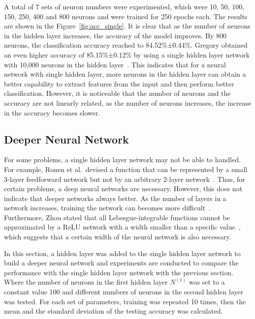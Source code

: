 \documentclass[conference]{IEEEtran}
\begin{document}
A total of 7 sets of neuron numbers were experimented, which were 10, 50, 100, 150, 250, 400 and 800 neurons and were trained for 250 epochs each. The results are shown in the Figure~\ref{fig:acc_single}. It is clear that as the number of neurons in the hidden layer increases, the accuracy of the model improves. By 800 neurons, the classification accuracy reached to 84.52\%±0.44\%. Gregory obtained an even higher accuracy of 85.15\%±0.12\% by using a single hidden layer network with 10,000 neurons in the hidden layer~\cite{cohen2017emnist}. This indicates that for a neural network with single hidden layer, more neurons in the hidden layer can obtain a better capability to extract features from the input and then perform better classification. However, it is noticeable that the number of neurons and the accuracy are not linearly related, as the number of neurons increases, the increase in the accuracy becomes slower.

\subsection{Deeper Neural Network}

For some problems, a single hidden layer network may not be able to handled. For example, Ronen et al.\ devised a function that can be represented by a small 3-layer feedforward network but not by an arbitrary 2-layer network~\cite{eldan2016power}. Thus, for certain problems, a deep neural networks are necessary. However, this does not indicate that deeper networks always better. As the number of layers in a network increases, training the network can becomes more difficult~\cite{glorot2010understanding}. Furthermore, Zhou stated that all Lebesgue-integrable functions cannot be approximated by a ReLU network with a width smaller than a specific value~\cite{lu2017expressive}, which suggests that a certain width of the neural network is also necessary.

In this section, a hidden layer was added to the single hidden layer network to build a deeper neural network and experiments are conducted to compare the performance with the single hidden layer network with the previous section. Where the number of neurons in the first hidden layer \(N^{(1)}\) was set to a constant value 100 and different numbers of neurons in the second hidden layer was tested. For each set of parameters, training was repeated 10 times, then the mean and the standard deviation of the testing accuracy was calculated.
\end{document}
